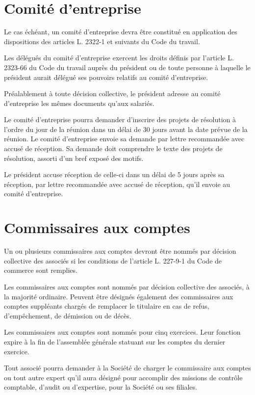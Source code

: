\documentclass[a4paper,12pt]{report}
\begin{document}
\section{Comité d'entreprise}
Le cas échéant, un comité d'entreprise devra être constitué en application des dispositions des articles L. 2322-1 et suivants du Code du travail.

Les délégués du comité d'entreprise exercent les droits définis par l'article L. 2323-66 du Code du travail auprès du président ou de toute personne à laquelle le président aurait délégué ses pouvoirs relatifs au comité d'entreprise.

Préalablement à toute décision collective, le président adresse au comité d'entreprise les mêmes documents qu'aux salariés.

Le comité d'entreprise pourra demander d'inscrire des projets de résolution à l'ordre du jour de la réunion dans un délai de 30 jours avant la date prévue de la réunion. Le comité d'entreprise envoie sa demande par lettre recommandée avec accusé de réception. Sa demande doit comprendre le texte des projets de résolution, assorti d'un bref exposé des motifs.

Le président accuse réception de celle-ci dans un délai de 5 jours après sa réception, par lettre recommandée avec accusé de réception, qu'il envoie au comité d'entreprise.

\section{Commissaires aux comptes}
Un ou plusieurs commissaires aux comptes devront être nommés par décision collective des associés si les conditions de l'article L. 227-9-1 du Code de commerce sont remplies.

Les commissaires aux comptes sont nommés par décision collective des associés, à la majorité ordinaire. Peuvent être désignés également des commissaires aux comptes suppléants chargés de remplacer le titulaire en cas de refus, d'empêchement, de démission ou de décès.

Les commissaires aux comptes sont nommés pour cinq exercices. Leur fonction expire à la fin de l'assemblée générale statuant sur les comptes du dernier exercice.

Tout associé pourra demander à la Société de charger le commissaire aux comptes ou tout autre expert qu'il aura désigné pour accomplir des missions de contrôle comptable, d'audit ou d'expertise, pour la Société ou ses filiales.
\end{document}
